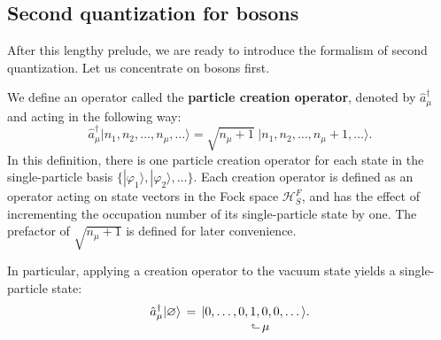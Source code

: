 \documentclass[pra,12pt]{revtex4}
\begin{document}
\subsection{Second quantization for bosons}
\label{sec:second_quantized_bosons}

After this lengthy prelude, we are ready to introduce the formalism of
second quantization.  Let us concentrate on bosons first.  

We define an operator called the \textbf{particle creation operator},
denoted by $\hat{a}_\mu^\dagger$ and acting in the following way:
$$\hat{a}_\mu^\dagger \big|n_1, n_2, \dots, n_\mu, \dots\big\rangle = \sqrt{n_\mu+1} \; \big|n_1, n_2, \dots, n_\mu + 1, \dots\big\rangle. $$
In this definition, there is one particle creation operator for each
state in the single-particle basis
$\{|\varphi_1\rangle,|\varphi_2\rangle,\dots\}$.  Each creation operator is
defined as an operator acting on state vectors in the Fock space
$\mathscr{H}^F_S$, and has the effect of incrementing the occupation
number of its single-particle state by one.  The prefactor of
$\sqrt{n_\mu+1}$ is defined for later convenience.

In particular, applying a creation operator to the vacuum state yields
a single-particle state:
$$\begin{aligned}\hat{a}_\mu^\dagger |\varnothing\rangle \, &= \, |0,\dots,0, 1, 0, 0, \dots\rangle. \\[-1ex] &\qquad\qquad\quad\;\;\rotatebox[origin=c]{90}{$\Rsh$}\,\mu
\end{aligned}$$
\end{document}
